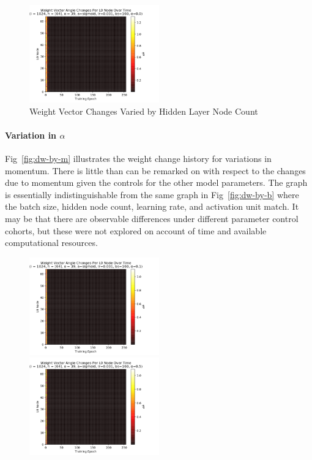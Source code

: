 \documentclass[10pt,epsf]{article}
\begin{document}
{{\begin{figure}[H]
      \includegraphics[width=0.5\textwidth]{./img/64-0.001-160-0-sigmoid-1/weight-angle-changes-L0-255.png}
      \caption{Weight Vector Changes Varied by Hidden Layer Node Count}
      \label{fig:dw-by-nh}
    \end{figure}
    \paragraph{Variation in $\alpha$}{
      Fig~\ref{fig:dw-by-m} illustrates the weight change history for variations in momentum.
      There is little than can be remarked on with respect to the
      changes due to momentum given the controls for the other model parameters. The graph is
      essentially indistinguishable from the same graph in Fig~\ref{fig:dw-by-b} where the batch size,
      hidden node count, learning rate, and activation unit match. It may be that there are observable
      differences under different parameter control cohorts, but these were not explored on account
      of time and available computational resources.
    }
    \begin{figure}[H]
      \includegraphics[width=0.5\textwidth]{./img/64-0.001-160-0.1-sigmoid-1/weight-angle-changes-L0-255.png}
      \includegraphics[width=0.5\textwidth]{./img/64-0.001-160-0.5-sigmoid-1/weight-angle-changes-L0-255.png}

\end{figure}}}
\end{document}
